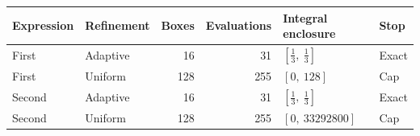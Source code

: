 \begin{tabular}{@{}llrrll@{}}\toprule
Expression & Refinement & Boxes & Evaluations & Integral enclosure & Stop\\\midrule
First & Adaptive & 16 & 31 & $[\frac{1}{3},\ \frac{1}{3}]$ & Exact \\
First & Uniform & 128 & 255 & $[0,\ 128]$ & Cap \\
Second & Adaptive & 16 & 31 & $[\frac{1}{3},\ \frac{1}{3}]$ & Exact \\
Second & Uniform & 128 & 255 & $[0,\ 33292800]$ & Cap \\
\bottomrule\end{tabular}
